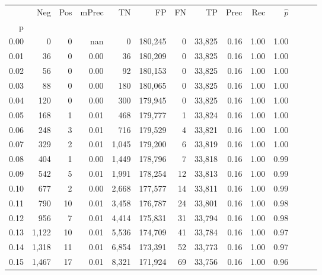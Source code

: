 \begin{tabular}{rrrrrrrrrrrrrr}
\toprule
{} &    Neg &  Pos & mPrec &       TN &       FP &      FN &      TP &  Prec &   Rec & $\hat{p}$ \\
p    &        &      &       &          &          &         &         &       &       &           \\
\midrule
0.00 &      0 &    0 &   nan &        0 &  180,245 &       0 &  33,825 &  0.16 &  1.00 &      1.00 \\
0.01 &     36 &    0 &  0.00 &       36 &  180,209 &       0 &  33,825 &  0.16 &  1.00 &      1.00 \\
0.02 &     56 &    0 &  0.00 &       92 &  180,153 &       0 &  33,825 &  0.16 &  1.00 &      1.00 \\
0.03 &     88 &    0 &  0.00 &      180 &  180,065 &       0 &  33,825 &  0.16 &  1.00 &      1.00 \\
0.04 &    120 &    0 &  0.00 &      300 &  179,945 &       0 &  33,825 &  0.16 &  1.00 &      1.00 \\
0.05 &    168 &    1 &  0.01 &      468 &  179,777 &       1 &  33,824 &  0.16 &  1.00 &      1.00 \\
0.06 &    248 &    3 &  0.01 &      716 &  179,529 &       4 &  33,821 &  0.16 &  1.00 &      1.00 \\
0.07 &    329 &    2 &  0.01 &    1,045 &  179,200 &       6 &  33,819 &  0.16 &  1.00 &      1.00 \\
0.08 &    404 &    1 &  0.00 &    1,449 &  178,796 &       7 &  33,818 &  0.16 &  1.00 &      0.99 \\
0.09 &    542 &    5 &  0.01 &    1,991 &  178,254 &      12 &  33,813 &  0.16 &  1.00 &      0.99 \\
0.10 &    677 &    2 &  0.00 &    2,668 &  177,577 &      14 &  33,811 &  0.16 &  1.00 &      0.99 \\
0.11 &    790 &   10 &  0.01 &    3,458 &  176,787 &      24 &  33,801 &  0.16 &  1.00 &      0.98 \\
0.12 &    956 &    7 &  0.01 &    4,414 &  175,831 &      31 &  33,794 &  0.16 &  1.00 &      0.98 \\
0.13 &  1,122 &   10 &  0.01 &    5,536 &  174,709 &      41 &  33,784 &  0.16 &  1.00 &      0.97 \\
0.14 &  1,318 &   11 &  0.01 &    6,854 &  173,391 &      52 &  33,773 &  0.16 &  1.00 &      0.97 \\
0.15 &  1,467 &   17 &  0.01 &    8,321 &  171,924 &      69 &  33,756 &  0.16 &  1.00 &      0.96 \\

\end{tabular}
